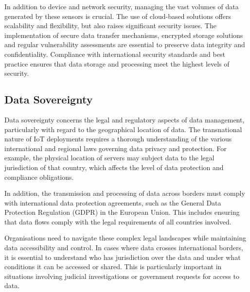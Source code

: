 \documentclass[12pt,oneside]{book} %
\begin{document}
In addition to device and network security, managing the vast volumes of data
generated by these sensors is crucial. The use of cloud-based solutions offers
scalability and flexibility, but also raises significant security issues. The
implementation of secure data transfer mechanisms, encrypted storage solutions
and regular vulnerability assessments are essential to preserve data integrity
and confidentiality. Compliance with international security standards and best
practice ensures that data storage and processing meet the highest levels of
security.

\subsection{Data Sovereignty}
Data sovereignty concerns the legal and regulatory aspects of data management,
particularly with regard to the geographical location of data. The
transnational nature of IoT deployments requires a thorough understanding of
the various international and regional laws governing data privacy and
protection. For example, the physical location of servers may subject data to
the legal jurisdiction of that country, which affects the level of data
protection and compliance obligations.

In addition, the transmission and processing of data across borders must comply
with international data protection agreements, such as the General Data
Protection Regulation (GDPR) in the European Union. This includes ensuring that
data flows comply with the legal requirements of all countries involved.

Organisations need to navigate these complex legal landscapes while maintaining
data accessibility and control. In cases where data crosses international
borders, it is essential to understand who has jurisdiction over the data and
under what conditions it can be accessed or shared. This is particularly
important in situations involving judicial investigations or government
requests for access to data.

\newpage
\end{document}
